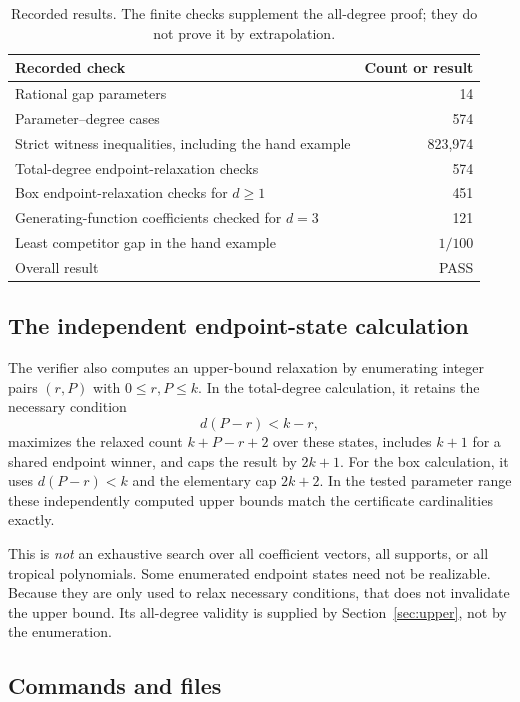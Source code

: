 \documentclass[11pt,a4paper]{article}
\numberwithin{equation}{section}
\theoremstyle{definition}
\theoremstyle{remark}
\begin{document}
\begin{table}[ht]
\centering
\begin{tabular}{@{}lr@{}}
\toprule
Recorded check & Count or result\\
\midrule
Rational gap parameters & 14\\
Parameter--degree cases & 574\\
Strict witness inequalities, including the hand example & 823,974\\
Total-degree endpoint-relaxation checks & 574\\
Box endpoint-relaxation checks for $d\geq1$ & 451\\
Generating-function coefficients checked for $d=3$ & 121\\
Least competitor gap in the hand example & $1/100$\\
Overall result & PASS\\
\bottomrule
\end{tabular}
\caption{Recorded results. The finite checks supplement the all-degree proof;
they do not prove it by extrapolation.}
\label{tab:checks}
\end{table}

\subsection{The independent endpoint-state calculation}

The verifier also computes an upper-bound relaxation by enumerating integer
pairs $(r,P)$ with $0\leq r,P\leq k$. In the total-degree calculation, it
retains the necessary condition
\[
d(P-r)<k-r,
\]
maximizes the relaxed count $k+P-r+2$ over these states, includes $k+1$ for a
shared endpoint winner, and caps the result by $2k+1$.
For the box calculation, it uses $d(P-r)<k$ and the elementary cap $2k+2$.
In the tested parameter range these independently computed upper bounds
match the certificate cardinalities exactly.

This is \emph{not} an exhaustive search over all coefficient vectors, all
supports, or all tropical polynomials. Some enumerated endpoint states need
not be realizable. Because they are only used to relax necessary conditions,
that does not invalidate the upper bound. Its all-degree validity is supplied
by Section~\ref{sec:upper}, not by the enumeration.

\subsection{Commands and files}
\end{document}
